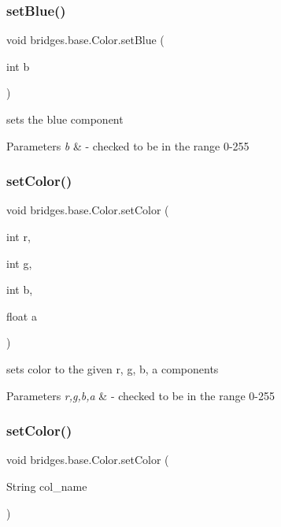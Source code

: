 \subsubsection{\texorpdfstring{set\+Blue()}{setBlue()}}
{\footnotesize\ttfamily void bridges.\+base.\+Color.\+set\+Blue (\begin{DoxyParamCaption}\item[{int}]{b }\end{DoxyParamCaption})}

sets the blue component


\begin{DoxyParams}{Parameters}
{\em b} & -\/ checked to be in the range 0-\/255 \\
\hline
\end{DoxyParams}
\mbox{\label{classbridges_1_1base_1_1_color_a5559b1c7eb4c3901526b1012029b528f}} 
\subsubsection{\texorpdfstring{set\+Color()}{setColor()}\hspace{0.1cm}{\footnotesize\ttfamily [1/2]}}
{\footnotesize\ttfamily void bridges.\+base.\+Color.\+set\+Color (\begin{DoxyParamCaption}\item[{int}]{r,  }\item[{int}]{g,  }\item[{int}]{b,  }\item[{float}]{a }\end{DoxyParamCaption})}

sets color to the given r, g, b, a components


\begin{DoxyParams}{Parameters}
{\em r,g,b,a} & -\/ checked to be in the range 0-\/255 \\
\hline
\end{DoxyParams}
\mbox{\label{classbridges_1_1base_1_1_color_a54dcd31227bde0f5d0a4f5d3b5a24ed2}} 
\subsubsection{\texorpdfstring{set\+Color()}{setColor()}\hspace{0.1cm}{\footnotesize\ttfamily [2/2]}}
{\footnotesize\ttfamily void bridges.\+base.\+Color.\+set\+Color (\begin{DoxyParamCaption}\item[{String}]{col\+\_\+name }\end{DoxyParamCaption})}

